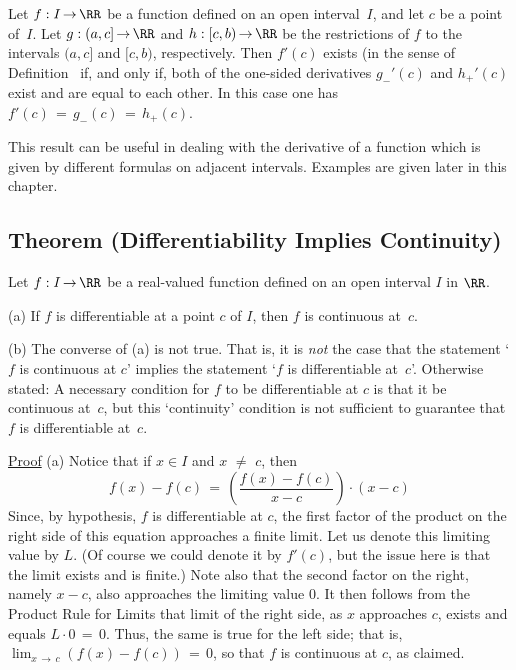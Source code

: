         Let $f:I \,{\rightarrow}\, {\RR}$ be a function defined on an open interval~$I$, and let $c$ be a point of~$I$.
    Let $g:(a,c] \,{\rightarrow}\, {\RR}$ and $h:[c,b) \,{\rightarrow}\, {\RR}$ be the restrictions of $f$ to the intervals $(a,c]$ and $[c,b)$, respectively.
    Then $f'(c)$ exists (in the sense of Definition~ if, and only if, both of the one-sided derivatives $g_{-}'(c)$ and $h_{+}'(c)$ exist and are equal to each other.
    In this case one has $f'(c) \,=\, g_{-}(c) \,=\, h_{+}(c)$. \Q

\V

        This result can be useful in dealing with the derivative of a function which is given by different formulas on adjacent intervals. Examples are given later in this chapter.

\VV


            \subsection{\small{\bf Theorem (Differentiability Implies Continuity)}}
            \label{ThmE20.30}

\V

        Let $f:I \,{\rightarrow}\, {\RR}$ be a real-valued function defined on an open interval $I$ in ${\RR}$.

\V
        (a) If $f$ is differentiable at a point $c$ of $I$, then $f$ is continuous at~$c$.

\V

        (b) The converse of (a) is not true. That is, it is {\em not} the case that the statement
    `$f$ is continuous at $c$' implies the statement `$f$ is differentiable at~$c$'.
    Otherwise stated: A necessary condition for $f$ to be differentiable at $c$ is that it be continuous at~$c$,
    but this `continuity' condition is not sufficient to guarantee that $f$ is differentiable at~$c$.

\V

        \underline{Proof} (a) Notice that if $x{\in}I$ and $x \,\,{\neq}\,\, c$, then
        \begin{displaymath}
        f(x)-f(c) \,=\, \left(\frac{f(x)-f(c)}{x-c}\right){\cdot}(x-c)
        \end{displaymath}
    Since, by hypothesis, $f$ is differentiable at $c$, the first factor of the product on the right side of this equation approaches a finite limit.
    Let us denote this limiting value by $L$. (Of course we could denote it by $f'(c)$, but the issue here is that the limit exists and is finite.)
    Note also that the second factor on the right, namely $x-c$, also approaches the limiting value $0$.
    It then follows from the Product Rule for Limits that limit of the right side, as $x$ approaches $c$, exists and equals $L{\cdot}0 \,=\, 0$.
    Thus, the same is true for the left side; that is, $\lim_{x \,{\rightarrow}\, c} (f(x)-f(c)) \,=\, 0$, so that $f$ is continuous at $c$, as claimed.

